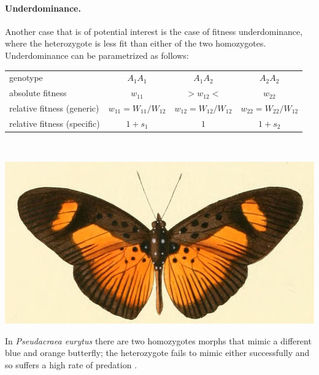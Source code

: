 \paragraph{Underdominance.} Another case that is of potential interest is the case of fitness
underdominance, where the heterozygote is less fit than either of the two
homozygotes. Underdominance can be parametrized as follows: \\
\begin{center}
\begin{tabular}{lccc}
	genotype & $A_1A_1$ & $A_1A_2$ & $A_2A_2$ \\
	absolute fitness & $w_{11}$ & $>w_{12}<$ & $w_{22}$ \\
	relative fitness (generic) & $w_{11}=W_{11}/W_{12}$ & $w_{12} = W_{12}/W_{12}$ & $w_{22} = W_{22}/W_{12}$ \\
	relative fitness (specific)  & $1+s_1$ & $1$ & $1+s_2$ \\
\end{tabular}\\
\end{center}
\begin{marginfigure}[1.5cm]
\begin{center}
  \includegraphics[width = \textwidth]{illustration_images/single_locus_selection/Pseudacraea_eurytus/Pseudacraea_eurytus.JPG}
\end{center}
\caption{In {\it Pseudacraea eurytus} there are two homozygotes morphs that mimic
 a different blue and orange butterfly; the heterozygote fails to mimic
either successfully and so suffers a high rate of predation
\citep{owen1972polymorphic}. } \label{fig:underdom_buttfly}  %
\end{marginfigure}


